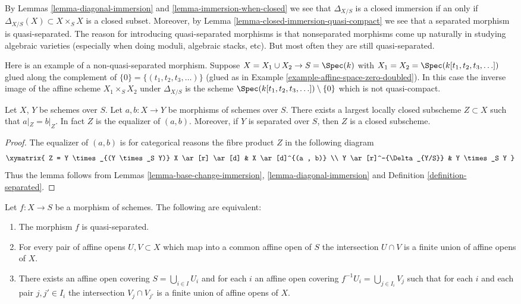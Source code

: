 \noindent
By Lemmas \ref{lemma-diagonal-immersion} and \ref{lemma-immersion-when-closed}
we see that $\Delta_{X/S}$ is a closed immersion if an only if
$\Delta_{X/S}(X) \subset X \times_S X$ is a closed subset. Moreover,
by Lemma \ref{lemma-closed-immersion-quasi-compact} we see that a
separated morphism is quasi-separated. The reason for introducing
quasi-separated morphisms is that nonseparated morphisms come up naturally
in studying algebraic varieties (especially when doing moduli,
algebraic stacks, etc). But most often they are still quasi-separated.

\begin{example}
\label{example-not-quasi-separated}
Here is an example of a non-quasi-separated morphism.
Suppose $X = X_1 \cup X_2 \to S = \Spec(k)$ with
$X_1 = X_2 = \Spec(k[t_1, t_2, t_3, \ldots])$
glued along the complement of $\{0\} = \{(t_1, t_2, t_3, \ldots)\}$
(glued as in Example \ref{example-affine-space-zero-doubled}).
In this case the inverse image of the affine scheme
$X_1 \times_S X_2$ under $\Delta_{X/S}$ is the scheme
$\Spec(k[t_1, t_2, t_3, \ldots]) \setminus \{0\}$
which is not quasi-compact.
\end{example}

\begin{lemma}
\label{lemma-where-are-they-equal}
Let $X$, $Y$ be schemes over $S$.
Let $a, b : X \to Y$ be morphisms of schemes over $S$.
There exists a largest locally closed subscheme
$Z \subset X$ such that $a|_Z = b|_Z$. In fact $Z$ is
the equalizer of $(a, b)$. Moreover, if $Y$ is separated
over $S$, then $Z$ is a closed subscheme.
\end{lemma}

\begin{proof}
The equalizer of $(a, b)$ is for categorical reasons
the fibre product $Z$ in the following diagram
$$
\xymatrix{
Z = Y \times_{(Y \times_S Y)} X \ar[r] \ar[d] &
 X \ar[d]^{(a , b)} \\
Y \ar[r]^-{\Delta_{Y/S}} & Y \times_S Y
}
$$
Thus the lemma follows from Lemmas
\ref{lemma-base-change-immersion}, \ref{lemma-diagonal-immersion} and
Definition \ref{definition-separated}.
\end{proof}

\begin{lemma}
\label{lemma-characterize-quasi-separated}
Let $f : X \to S$ be a morphism of schemes.
The following are equivalent:
\begin{enumerate}
\item The morphism $f$ is quasi-separated.
\item For every pair of affine opens $U, V \subset X$
which map into a common affine open of $S$ the intersection
$U \cap V$ is a finite union of affine opens of $X$.
\item There exists an affine open covering $S = \bigcup_{i \in I} U_i$
and for each $i$ an affine open covering $f^{-1}U_i = \bigcup_{j \in I_i} V_j$
such that for each $i$ and each pair $j, j' \in I_i$ the
intersection $V_j \cap V_{j'}$ is a finite union of affine
opens of $X$.
\end{enumerate}
\end{lemma}

